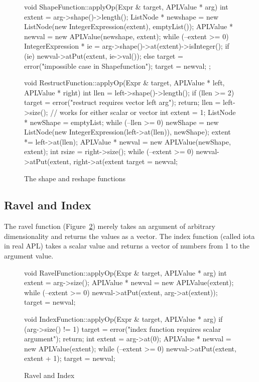 \begin{figure}
\begin{cprog}
void ShapeFunction::applyOp(Expr & target, APLValue * arg)
{
	int extent = arg->shape()->length();
	ListNode * newshape = new ListNode(new IntegerExpression(extent),
			emptyList());
	APLValue * newval = new APLValue(newshape, extent);
	while (--extent >= 0) {
		IntegerExpression * ie = arg->shape()->at(extent)->isInteger();
		if (ie)
			newval->atPut(extent, ie->val());
		else
			target = error("impossible case in Shapefunction");
		}
	target = newval;
};

void RestructFunction::applyOp(Expr & target, APLValue * left, APLValue * right)
{
	int llen = left->shape()->length();
	if (llen >= 2) {
		target = error("restruct requires vector left arg");
		return;
		}
	llen = left->size();	// works for either scalar or vector
	int extent = 1;
	ListNode * newShape = emptyList;
	while (--llen >= 0) {
		newShape = new ListNode(new IntegerExpression(left->at(llen)),
			newShape);
		extent *= left->at(llen);
		}
	APLValue * newval = new APLValue(newShape, extent);
	int rsize = right->size();
	while (--extent >= 0)
		newval->atPut(extent, right->at(extent %
	target = newval;
}
\end{cprog}
\caption{The shape and reshape functions}\label{shape}
\end{figure}

\subsection{Ravel and Index}

The ravel function (Figure~\ref{ravel}) merely takes an argument of
arbitrary dimensionality and returns the values as a vector.  The index
function (called iota in real APL) takes a scalar value and returns a
vector of numbers from 1 to the argument value.

\begin{figure}
\begin{cprog}
void RavelFunction::applyOp(Expr & target, APLValue * arg)
{
	int extent = arg->size();
	APLValue * newval = new APLValue(extent);
	while (--extent >= 0) 
		newval->atPut(extent, arg->at(extent));
	target = newval;
}

void IndexFunction::applyOp(Expr & target, APLValue * arg)
{
	if (arg->size() != 1) {
		target = error("index function requires scalar argument");
		return;
		}
	int extent = arg->at(0);
	APLValue * newval = new APLValue(extent);
	while (--extent >= 0)
		newval->atPut(extent, extent + 1);
	target = newval;
}
\end{cprog}
\caption{Ravel and Index}\label{ravel}
\end{figure}

